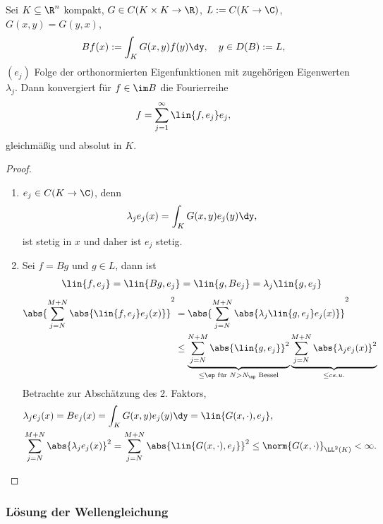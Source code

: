 \begin{prop}
\label{prop:1.45}
Sei $K\subseteq \R^n$ kompakt, $G\in C(K\times K\to\R)$, $L:=C(K\to\C)$,
$G(x,y)=G(y,x)$,
\begin{align*}
Bf(x) := \int_K G(x,y)f(y)\dy,\quad y\in D(B) := L,
\end{align*}
$(e_j)$ Folge der orthonormierten Eigenfunktionen mit zugehörigen Eigenwerten
$\lambda_j$. Dann konvergiert für $f\in\im B$ die Fourierreihe
\begin{align*}
f = \sum\limits_{j=1}^\infty \lin{f,e_j}e_j,
\end{align*}
gleichmäßig und absolut in $K$.\fishhere
\end{prop}
\begin{proof}
\begin{enumerate}[label=\arabic{*}.)]
  \item $e_j\in C(K\to\C)$, denn
\begin{align*}
\lambda_j e_j(x) = \int_K G(x,y)e_j(y)\dy,
\end{align*}
ist stetig in $x$ und daher ist $e_j$ stetig.
\item Sei $f=Bg$ und $g\in L$, dann ist
\begin{align*}
\lin{f,e_j} = \lin{Bg,e_j} = \lin{g,Be_j} = \lambda_j\lin{g,e_j} 
\end{align*}
\begin{align*}
\abs{\sum\limits_{j=N}^{M+N} \abs{\lin{f,e_j}e_j(x)}}^2
&= \abs{\sum\limits_{j=N}^{M+N} \abs{\lambda_j\lin{g,e_j}e_j(x)}}^2\\
&\le \underbrace{\sum\limits_{j=N}^{N+M} \abs{\lin{g,e_j}}^2}_{\le \ep
\text{ für } N>N_\ep \text{ Bessel}} \underbrace{\sum\limits_{j=N}^{M+N}
\abs{\lambda_j e_j(x)}^2}_{\le c s.u.}
\end{align*}
Betrachte zur Abschätzung des 2. Faktors,
\begin{align*}
&\lambda_j e_j(x) = Be_j(x) = \int_K G(x,y)e_j(y)\dy = \lin{G(x,\cdot),e_j},\\
&\sum\limits_{j=N}^{M+N} \abs{\lambda_j e_j(x)}^2
= \sum\limits_{j=N}^{M+N}\abs{\lin{G(x,\cdot),e_j}}^2
\le \norm{G(x,\cdot)}_{\LL^2(K)} < \infty.\qedhere
\end{align*}
\end{enumerate}
\end{proof}

\subsubsection{Lösung der Wellengleichung}

